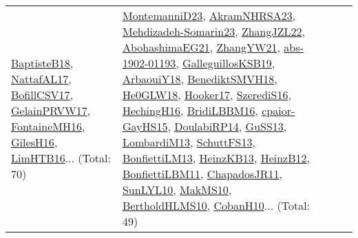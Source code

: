{\begin{longtable}{lp{3cm}>{\raggedright}p{6cm}>{\raggedright}p{6cm}p{8cm}}
\href{articles/BaptisteB18.pdf}{BaptisteB18}\cite{BaptisteB18}, \href{articles/NattafAL17.pdf}{NattafAL17}\cite{NattafAL17}, \href{papers/BofillCSV17.pdf}{BofillCSV17}\cite{BofillCSV17}, \href{papers/GelainPRVW17.pdf}{GelainPRVW17}\cite{GelainPRVW17}, \href{papers/FontaineMH16.pdf}{FontaineMH16}\cite{FontaineMH16}, \href{papers/GilesH16.pdf}{GilesH16}\cite{GilesH16}, \href{papers/LimHTB16.pdf}{LimHTB16}\cite{LimHTB16}... (Total: 70) & \href{articles/MontemanniD23.pdf}{MontemanniD23}\cite{MontemanniD23}, \href{articles/AkramNHRSA23.pdf}{AkramNHRSA23}\cite{AkramNHRSA23}, \href{papers/Mehdizadeh-Somarin23.pdf}{Mehdizadeh-Somarin23}\cite{Mehdizadeh-Somarin23}, \href{papers/ZhangJZL22.pdf}{ZhangJZL22}\cite{ZhangJZL22}, \href{articles/AbohashimaEG21.pdf}{AbohashimaEG21}\cite{AbohashimaEG21}, \href{articles/ZhangYW21.pdf}{ZhangYW21}\cite{ZhangYW21}, \href{articles/abs-1902-01193.pdf}{abs-1902-01193}\cite{abs-1902-01193}, \href{papers/GalleguillosKSB19.pdf}{GalleguillosKSB19}\cite{GalleguillosKSB19}, \href{papers/ArbaouiY18.pdf}{ArbaouiY18}\cite{ArbaouiY18}, \href{papers/BenediktSMVH18.pdf}{BenediktSMVH18}\cite{BenediktSMVH18}, \href{papers/He0GLW18.pdf}{He0GLW18}\cite{He0GLW18}, \href{papers/Hooker17.pdf}{Hooker17}\cite{Hooker17}, \href{papers/SzerediS16.pdf}{SzerediS16}\cite{SzerediS16}, \href{papers/HechingH16.pdf}{HechingH16}\cite{HechingH16}, \href{papers/BridiLBBM16.pdf}{BridiLBBM16}\cite{BridiLBBM16}, \href{papers/cpaior-GayHS15.pdf}{cpaior-GayHS15}\cite{cpaior-GayHS15}, \href{papers/DoulabiRP14.pdf}{DoulabiRP14}\cite{DoulabiRP14}, \href{papers/GuSS13.pdf}{GuSS13}\cite{GuSS13}, \href{papers/LombardiM13.pdf}{LombardiM13}\cite{LombardiM13}, \href{papers/SchuttFS13.pdf}{SchuttFS13}\cite{SchuttFS13}, \href{papers/BonfiettiLM13.pdf}{BonfiettiLM13}\cite{BonfiettiLM13}, \href{papers/HeinzKB13.pdf}{HeinzKB13}\cite{HeinzKB13}, \href{papers/HeinzB12.pdf}{HeinzB12}\cite{HeinzB12}, \href{papers/BonfiettiLBM11.pdf}{BonfiettiLBM11}\cite{BonfiettiLBM11}, \href{papers/ChapadosJR11.pdf}{ChapadosJR11}\cite{ChapadosJR11}, \href{papers/SunLYL10.pdf}{SunLYL10}\cite{SunLYL10}, \href{papers/MakMS10.pdf}{MakMS10}\cite{MakMS10}, \href{papers/BertholdHLMS10.pdf}{BertholdHLMS10}\cite{BertholdHLMS10}, \href{papers/CobanH10.pdf}{CobanH10}\cite{CobanH10}... (Total: 49)\\

\end{longtable}}
